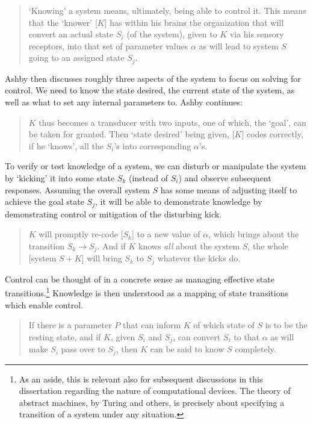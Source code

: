 \documentclass[11pt, oneside]{article}   	%
\begin{document}
\begin{quote}
`Knowing' a system means, ultimately, being able to control it.  This means that the `knower' [$K$] has within his brains the organization that will convert an actual state $S_i$ (of the system), given to $K$ via his sensory receptors, into that set of parameter values $\alpha$ as will lead to system $S$ going to an assigned state $S_j$. \cite[p. 4292]{AshbyJournal}
\end{quote}

Ashby then discusses roughly three aspects of the system to focus on solving for control.  We need to know the state desired, the current state of the system, as well as what to set any internal parameters to.  Ashby continues:

\begin{quote}
$K$ thus becomes a transducer with two inputs, one of which, the `goal', can be taken for granted.  Then `state desired' being given, [$K$] codes correctly, if he `knows', all the $S_i$'s into corresponding $\alpha$'s.  \cite[p. 4292]{AshbyJournal}
\end{quote}

To verify or test knowledge of a system, we can disturb or manipulate the system by `kicking' it into some state $S_k$ (instead of $S_i$) and observe subsequent responses.  Assuming the overall system $S$ has some means of adjusting itself to achieve the goal state $S_j$, it will be able to demonstrate knowledge by demonstrating control or mitigation of the disturbing kick.

\begin{quote}
$K$ will promptly re-code [$S_k$] to a new value of $\alpha$, which brings about the transition $S_k \rightarrow S_j$.  And if $K$ knows \emph{all} about the system $S$, the whole [system $S + K$] will bring $S_k$ to $S_j$ whatever the kicks do.  \cite[p. 4293]{AshbyJournal}
\end{quote}

Control can be thought of in a concrete sense as managing effective state transitions.\footnote{As an aside, this is relevant also for subsequent discussions in this dissertation regarding the nature of computational devices.  The theory of abstract machines, by Turing and others, is precisely about specifying a transition of a system under any situation.}  Knowledge is then understood as a mapping of state transitions which enable control.

\begin{quote}
If there is a parameter $P$ that can inform $K$ of which state of $S$ is to be the resting state, and if $K$, given $S_i$ and $S_j$, can convert $S_i$ to that $\alpha$ as will make $S_i$ pass over to $S_j$, then $K$ can be said to know $S$ completely.  \cite[p. 4293]{AshbyJournal}
\end{quote}
\end{document}
